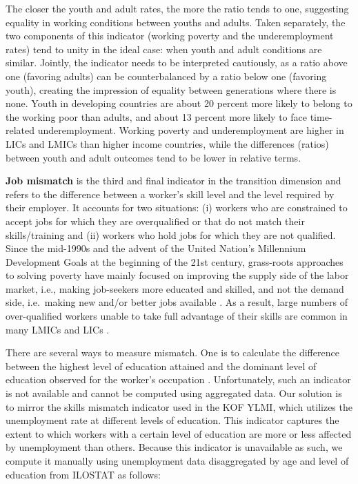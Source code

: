 \documentclass[
  a4paper, twoside, 12pt]{book}
\begin{document}
The closer the youth and adult rates, the more the ratio tends to one, suggesting equality in working conditions between youths and adults. Taken separately, the two components of this indicator (working poverty and the underemployment rates) tend to unity in the ideal case: when youth and adult conditions are similar. Jointly, the indicator needs to be interpreted cautiously, as a ratio above one (favoring adults) can be counterbalanced by a ratio below one (favoring youth), creating the impression of equality between generations where there is none. Youth in developing countries are about 20 percent more likely to belong to the working poor than adults, and about 13 percent more likely to face time-related underemployment. Working poverty and underemployment are higher in LICs and LMICs than higher income countries, while the differences (ratios) between youth and adult outcomes tend to be lower in relative terms.

\textbf{Job mismatch} is the third and final indicator in the transition dimension and refers to the difference between a worker's skill level and the level required by their employer. It accounts for two situations: (i) workers who are constrained to accept jobs for which they are overqualified or that do not match their skills/training and (ii) workers who hold jobs for which they are not qualified. Since the mid-1990s and the advent of the United Nation's Millennium Development Goals at the beginning of the 21st century, grass-roots approaches to solving poverty have mainly focused on improving the supply side of the labor market, i.e., making job-seekers more educated and skilled, and not the demand side, i.e.~making new and/or better jobs available \autocite{amsden2010,gore2010}. As a result, large numbers of over-qualified workers unable to take full advantage of their skills are common in many LMICs and LICs \autocite{handel2016}.

There are several ways to measure mismatch. One is to calculate the difference between the highest level of education attained and the dominant level of education observed for the worker's occupation \autocite{herrera2013}. Unfortunately, such an indicator is not available and cannot be computed using aggregated data. Our solution is to mirror the skills mismatch indicator used in the KOF YLMI, which utilizes the unemployment rate at different levels of education. This indicator captures the extent to which workers with a certain level of education are more or less affected by unemployment than others. Because this indicator is unavailable as such, we compute it manually using unemployment data disaggregated by age and level of education from ILOSTAT as follows:
\end{document}
